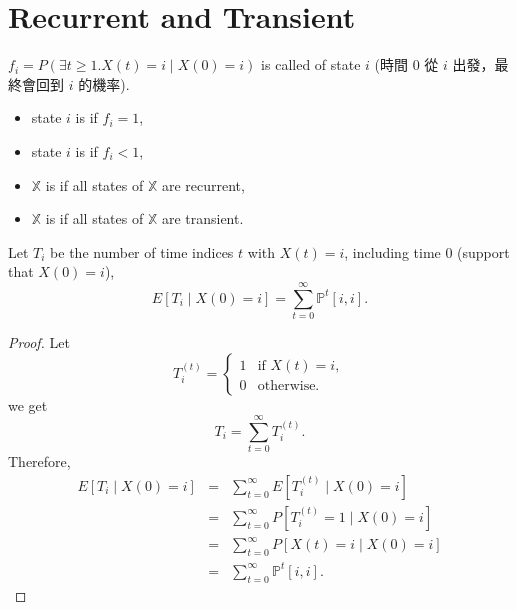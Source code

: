 \section{Recurrent and Transient}

\begin{definition}
$ f_{i} = P(\exists t \ge 1. X(t) = i \mid X(0) = i) $ is called  of state $ i $ {\small \color{gray} (時間 $ 0 $ 從 $ i $ 出發，最終會回到 $ i $ 的機率)}.
\begin{itemize}
  \item state $ i $ is  if $ f_{i} = 1 $,
  \item state $ i $ is  if $ f_{i} < 1 $,
  \item $ \mathbb{X} $ is  if all states of $ \mathbb{X} $ are recurrent,
  \item $ \mathbb{X} $ is  if all states of $ \mathbb{X} $ are transient.
\end{itemize}
\end{definition}

\begin{observation}
Let $ T_{i} $ be the number of time indices $ t $ with $ X(t) = i $, including time $ 0 $ (support that $ X(0) = i $),
\[ E[T_{i} \mid X(0) = i] = \sum_{t = 0}^{\infty} \mathbb{P}^{t}[i, i]. \]

\begin{proof}
Let
\[
T^{(t)}_{i} =
  \begin{cases}
    1 & \text{if } X(t) = i, \\
    0 & \text{otherwise.}
  \end{cases}
\]
we get
\[ T_{i} = \sum_{t = 0}^{\infty} T^{(t)}_{i}. \]
Therefore,
\begin{eqnarray*}
E[T_{i} \mid X(0) = i]
  & = & \sum_{t = 0}^{\infty} E[T^{(t)}_{i} \mid X(0) = i] \\
  & = & \sum_{t = 0}^{\infty} P[T^{(t)}_{i} = 1 \mid X(0) = i] \\
  & = & \sum_{t = 0}^{\infty} P[X(t) = i \mid X(0) = i] \\
  & = & \sum_{t = 0}^{\infty} \mathbb{P}^{t}[i, i].
\end{eqnarray*}
\end{proof}
\end{observation}

